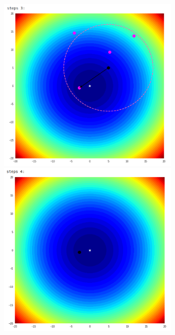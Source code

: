 \documentclass{book}
\begin{document}
\begin{itemize}
\begin{figure}[H]
\begin{figure}[H]
\begin{minipage}[c]{0.3\textwidth}
            \end{minipage}
        \end{figure}
        \begin{figure}[H]
            \begin{minipage}[c]{0.3\textwidth}
                \centering
                \includegraphics[width=\textwidth]{images/one_plus_lambda_ex_step_3.png}
            \end{minipage}
            \begin{minipage}[c]{0.3\textwidth}
                \centering
                \includegraphics[width=\textwidth]{images/one_plus_lambda_ex_step_4.png}

\end{minipage}
\end{figure}
\end{figure}
\end{itemize}
\end{document}
